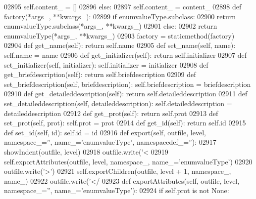 \begin{DoxyCode}
{{{{{{{{{{{{{{{{{{{{{{{{{{{{{{{{{{{{{{{{{{{{{{{{{{{{{{{{{{{{{{{{{{{{{{{{{{{{{{{{{{{{{{{{{{{{{{{{{{{{{{{{{{{{{{{{{{{{{{{{{{{{{{{{{{{{{{{{{{{{{{{{{{{{{{{{{{{{{{{{{{{{{{{{{{{{{{{{{{{{{{{{{{{{{{{{{{{{{02895             self.content_ = []
02896         \textcolor{keywordflow}{else}:
02897             self.content_ = content\_
02898     \textcolor{keyword}{def }factory(*args\_, **kwargs\_):
02899         \textcolor{keywordflow}{if} enumvalueType.subclass:
02900             \textcolor{keywordflow}{return} enumvalueType.subclass(*args\_, **kwargs\_)
02901         \textcolor{keywordflow}{else}:
02902             \textcolor{keywordflow}{return} enumvalueType(*args\_, **kwargs\_)
02903     factory = staticmethod(factory)
02904     \textcolor{keyword}{def }get_name(self): \textcolor{keywordflow}{return} self.name
02905     \textcolor{keyword}{def }set_name(self, name): self.name = name
02906     \textcolor{keyword}{def }get_initializer(self): \textcolor{keywordflow}{return} self.initializer
02907     \textcolor{keyword}{def }set_initializer(self, initializer): self.initializer = initializer
02908     \textcolor{keyword}{def }get_briefdescription(self): \textcolor{keywordflow}{return} self.briefdescription
02909     \textcolor{keyword}{def }set_briefdescription(self, briefdescription): self.briefdescription = briefdescription
02910     \textcolor{keyword}{def }get_detaileddescription(self): \textcolor{keywordflow}{return} self.detaileddescription
02911     \textcolor{keyword}{def }set_detaileddescription(self, detaileddescription): self.detaileddescription = detaileddescription
02912     \textcolor{keyword}{def }get_prot(self): \textcolor{keywordflow}{return} self.prot
02913     \textcolor{keyword}{def }set_prot(self, prot): self.prot = prot
02914     \textcolor{keyword}{def }get_id(self): \textcolor{keywordflow}{return} self.id
02915     \textcolor{keyword}{def }set_id(self, id): self.id = id
02916     \textcolor{keyword}{def }export(self, outfile, level, namespace\_='', name\_='enumvalueType', namespacedef\_=''):
02917         showIndent(outfile, level)
02918         outfile.write(\textcolor{stringliteral}{'<%
02919         self.exportAttributes(outfile, level, namespace\_, name\_=\textcolor{stringliteral}{'enumvalueType'})
02920         outfile.write(\textcolor{stringliteral}{'>'})
02921         self.exportChildren(outfile, level + 1, namespace\_, name\_)
02922         outfile.write(\textcolor{stringliteral}{'</%
02923     \textcolor{keyword}{def }exportAttributes(self, outfile, level, namespace\_='', name\_='enumvalueType'):
02924         \textcolor{keywordflow}{if} self.prot \textcolor{keywordflow}{is} \textcolor{keywordflow}{not} \textcolor{keywordtype}{None}:
}}}}}}}}}}}}}}}}}}}}}}}}}}}}}}}}}}}}}}}}}}}}}}}}}}}}}}}}}}}}}}}}}}}}}}}}}}}}}}}}}}}}}}}}}}}}}}}}}}}}}}}}}}}}}}}}}}}}}}}}}}}}}}}}}}}}}}}}}}}}}}}}}}}}}}}}}}}}}}}}}}}}}}}}}}}}}}}}}}}}}}}}}}}}}}}}}}}}}}}
\end{DoxyCode}
